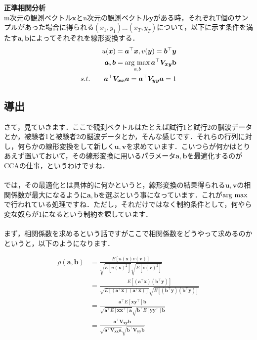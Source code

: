 \documentclass[11pt,a4paper,uplatex]{ujreport}
\newcommand{\argmax}{\mathop{\rm arg~max}\limits}
\begin{document}
\begin{screen}
  \textbf{正準相関分析}\\
  m次元の観測ベクトル$\bm{x}$とn次元の観測ベクトル$\bm{y}$がある時，それぞれT個のサンプルがあった場合に得られる$(x_1, y_1)...(x_T, y_T)$について，以下に示す条件を満たす$\bm{a,b}$によってそれぞれを線形変換する．
  \begin{align}
    u(\bm{x}) = \bm{a}^\top\bm{x}, v(\bm{y}) = \bm{b}^\top \bm{y}\\
    \bm{a,b} = \argmax_{a,b}\bm{a}^\top \bm{V_{xy}} \bf{b} \\
    s.t. \qquad \bm{a}^\top \bm{V_{xx}} \bm{a} = \bm{a}^\top \bm{V_{yy}} \bm{a} = 1 \nonumber
  \end{align}
\end{screen}

\subsection{導出}
さて，見ていきます．ここで観測ベクトルはたとえば試行1と試行2の脳波データとか，被験者1と被験者2の脳波データとか，そんな感じです．それらの行列に対し，何らかの線形変換をして新しく$\bm{u,v}$を求めています．こいつらが何かはとりあえず置いておいて，その線形変換に用いるパラメータ$\bm{a,b}$を最適化するのがCCAの仕事，というわけですね．\\
\\

では，その最適化とは具体的に何かというと，線形変換の結果得られる$\bm{u,v}$の相関係数が最大になるように$\bm{a,b}$を選ぶという事になっています．これが$\argmax$で行われている処理ですね．ただし，それだけではなく制約条件として，何やら変な奴らが1になるという制約を課しています．\\
\\

まず，相関係数を求めるという話ですがここで相関係数をどうやって求めるのかというと，以下のようになります．

\begin{align}
  \rho({\bm{a,b}}) &= \frac{E[u(\bm{x})v(\bm{v})]}{\sqrt{E[u(\bm{x})^2]}\sqrt{E[v(\bm{v})^2]}}\\
  &= \frac{E[(\bm{a^\top x})(\bm{b^\top y})]}{\sqrt{E[(\bm{a^\top x})(\bm{a^\top x})]}\sqrt{E[(\bm{b^\top y})(\bm{b^\top y})]}}\\
  &= \frac{\bm{a^\top}E[\bm{x y^\top}]\bm{b}}{\sqrt{\bm{a^\top}E[\bm{xx^\top}]\bm{a}}\sqrt{\bm{b^\top}E[\bm{yy^\top}]\bm{b}}}\label{eq:cca-sc0}\\
  &= \frac{\bm{a^\top V_{xy} b}}{\sqrt{\bm{a^\top V_{xx} a}}\sqrt{\bm{b^\top V_{yy} b}}}
  \label{eq:cca-sc}\\
\end{align}
\end{document}

